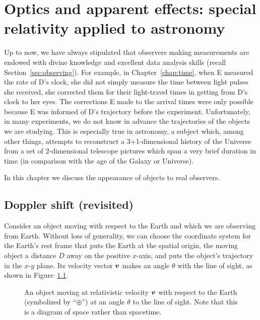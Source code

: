 \chapter{Optics and apparent effects: special relativity applied to
astronomy}
\label{chap:astronomy}

Up to now, we have always stipulated that observers making
measurements are endowed with divine knowledge and excellent data
analysis skills (recall Section~\ref{sec:observing}).  For example, in
Chapter~\ref{chap:time}, when E measured the rate of D's clock, she
did not simply measure the time between light pulses she received, she
corrected them for their light-travel times in getting from D's clock
to her eyes.  The corrections E made to the arrival times were only
possible because E was informed of D's trajectory before the
experiment.  Unfortunately, in many experiments, we do not know in
advance the trajectories of the objects we are studying.  This is
especially true in astronomy, a subject which, among other things,
attempts to reconstruct a 3+1-dimensional history of the Universe from
a set of 2-dimensional telescope pictures which span a very brief
duration in time (in comparison with the age of the Galaxy or
Universe).

In this chapter we discuss the appearance of objects to real
observers.


\section{Doppler shift (revisited)}
\label{sec:redshift}

Consider an object moving with respect to the Earth and which we are
observing from Earth.  Without loss of generality, we can choose the
coordinate system for the Earth's rest frame that puts the Earth at
the spatial origin, the moving object a distance $D$ away on the
positive $x$-axis, and puts the object's trajectory in the $x$-$y$
plane.  Its velocity vector $\mbox{\boldmath $v$}$ makes an angle $\theta$ with the
line of sight, as shown in Figure~\ref{fig:redshift}.
\begin{figure}
\caption[Object moving quickly with respect to the Earth]{An object
moving at relativistic velocity $\mbox{\boldmath $v$}$ with respect to the Earth
(symbolized by ``$\oplus$'') at an angle $\theta$ to the line of
sight.  Note that this is a diagram of space rather than spacetime.}
\label{fig:redshift}
\end{figure}

